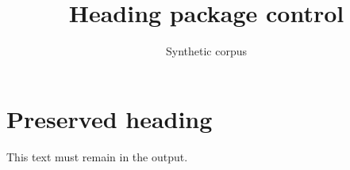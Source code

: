 \documentclass{article}
\title{Heading package control}
\author{Synthetic corpus}
\date{}
\begin{document}
\maketitle
\section{Preserved heading}
This text must remain in the output.
\end{document}
